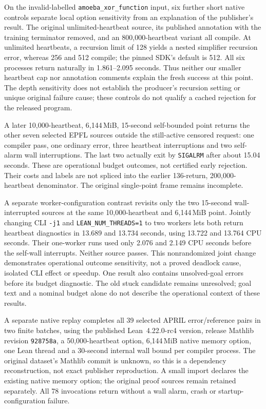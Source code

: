 \documentclass[10pt,twocolumn]{article}
\begin{document}
On the invalid-labelled \texttt{amoeba\_xor\_function} input, six further
short native controls separate local option sensitivity from an explanation
of the publisher's result. The original unlimited-heartbeat source, its
published annotation with the training terminator removed, and an
800,000-heartbeat variant all compile. At unlimited heartbeats, a recursion
limit of 128 yields a nested simplifier recursion error, whereas 256 and
512 compile; the pinned SDK's default is 512. All six processes return
naturally in 1.861--2.095 seconds. Thus neither our smaller heartbeat cap
nor annotation comments explain the fresh success at this point.
The depth sensitivity does not establish the producer's recursion setting
or unique original failure cause; these controls do not qualify a cached
rejection for the released program.

A later 10,000-heartbeat, 6,144\,MiB, 15-second self-bounded point returns
the other seven selected EPFL sources outside the still-active censored
request: one compiler pass, one ordinary error, three heartbeat
interruptions and two self-alarm wall interruptions. The last two actually
exit by \texttt{SIGALRM} after about 15.04 seconds. These are operational
budget outcomes, not certified early rejection. Their costs and labels are
not spliced into the earlier 136-return, 200,000-heartbeat denominator.
The original single-point frame remains incomplete.

A separate worker-configuration contrast revisits only the two 15-second
wall-interrupted sources at the same 10,000-heartbeat and 6,144\,MiB point.
Jointly changing CLI \texttt{-j1} and \texttt{LEAN\_NUM\_THREADS=1} to two
workers lets both return heartbeat diagnostics in 13.689 and 13.734 seconds,
using 13.722 and 13.764 CPU seconds. Their one-worker runs used only 2.076
and 2.149 CPU seconds before the self-wall interrupts. Neither source
passes. This nonrandomized joint change demonstrates operational outcome
sensitivity, not a proved deadlock cause, isolated CLI effect or speedup.
One result also contains unsolved-goal errors before its budget diagnostic.
The old stuck candidate remains unresolved; goal text and a nominal budget
alone do not describe the operational context of these results.


A separate native replay completes all 39 selected APRIL error/reference
pairs in two finite batches, using the published Lean~4.22.0-rc4 version,
release Mathlib revision \texttt{928758a}, a 50,000-heartbeat option,
6,144\,MiB native memory option, one Lean thread and a 30-second internal
wall bound per compiler process. The original dataset's Mathlib commit is
unknown, so this is a dependency reconstruction, not exact publisher
reproduction. A small import declares the existing native memory option;
the original proof sources remain retained separately. All 78 invocations
return without a wall alarm, crash or startup-configuration failure.
\end{document}
